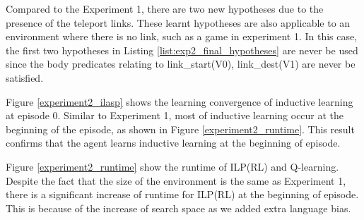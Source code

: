 
Compared to the Experiment 1, there are two new hypotheses due to the presence of the teleport links.
These learnt hypotheses are also applicable to an environment where there is no link, such as a game in experiment 1.
In this case, the first two hypotheses in Listing \ref{list:exp2_final_hypotheses} are never be used 
since the body predicates relating to link\_start(V0), link\_dest(V1) are never be satisfied.

Figure \ref{experiment2_ilasp} shows the learning convergence of inductive learning at episode 0.
Similar to Experiment 1, most of inductive learning occur at the beginning of the episode, as shown in Figure \ref{experiment2_runtime}. 
This result confirms that the agent learns inductive learning at the beginning of episode.

Figure \ref{experiment2_runtime} show the runtime of ILP(RL) and Q-learning. 
Despite the fact that the size of the environment is the same as Experiment 1, 
there is a significant increase of runtime for ILP(RL) at the beginning of episode. 
This is because of the increase of search space as we added extra language bias.

